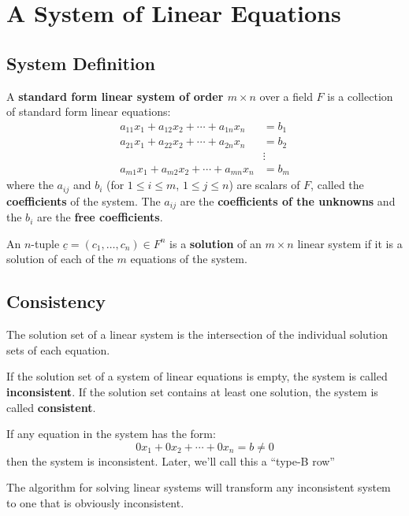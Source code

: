 \section{A System of Linear Equations}

\subsection{System Definition}

\begin{definition}\label{def:linear-system}
    A \textbf{standard form linear system of order $m \times n$} over a field $F$ is a collection of standard form linear equations:
    \begin{align*}
        a_{11}x_1 + a_{12}x_2 + \cdots + a_{1n}x_n &= b_1 \\
        a_{21}x_1 + a_{22}x_2 + \cdots + a_{2n}x_n &= b_2 \\
        &\vdots \\
        a_{m1}x_1 + a_{m2}x_2 + \cdots + a_{mn}x_n &= b_m
    \end{align*}
    where the $a_{ij}$ and $b_i$ (for $1 \leq i \leq m$, $1 \leq j \leq n$) are scalars of $F$, called the \textbf{coefficients} of the system. The $a_{ij}$ are the \textbf{coefficients of the unknowns} and the $b_i$ are the \textbf{free coefficients}.
\end{definition}

\begin{definition}\label{def:system-solution}
    An $n$-tuple $\underline{c} = (c_1, \ldots, c_n) \in F^n$ is a \textbf{solution} of an $m \times n$ linear system if it is a solution of each of the $m$ equations of the system.
\end{definition}

\subsection{Consistency}

The solution set of a linear system is the intersection of the individual solution sets of each equation.

\begin{definition}[Consistency]\label{def:consistency}
    If the solution set of a system of linear equations is empty, the system is called \textbf{inconsistent}. If the solution set contains at least one solution, the system is called \textbf{consistent}.
    
\end{definition}
\begin{note} 
    If any equation in the system has the form:
    \[
        0x_1 + 0x_2 + \cdots + 0x_n = b \neq 0
    \]
    then the system is inconsistent. Later, we'll call this a ``type-B row''
\end{note}  
\begin{note}
    The algorithm for solving linear systems will transform any inconsistent system to one that is obviously inconsistent.
\end{note}

